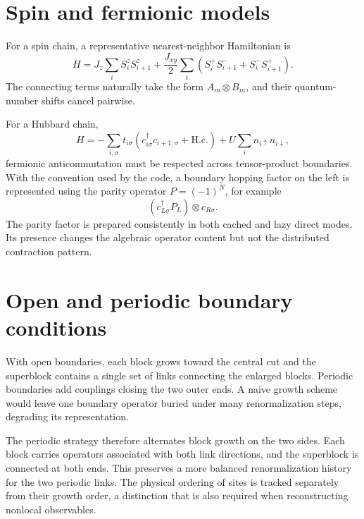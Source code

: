\documentclass[11pt,a4paper]{article}
\begin{document}
\section{Spin and fermionic models}

For a spin chain, a representative nearest-neighbor Hamiltonian is
\begin{equation}
  H=J_z\sum_i S_i^zS_{i+1}^z
    +\frac{J_{xy}}{2}\sum_i
     \left(S_i^+S_{i+1}^-+S_i^-S_{i+1}^+\right).
\end{equation}
The connecting terms naturally take the form $A_m\otimes B_m$, and their
quantum-number shifts cancel pairwise.

For a Hubbard chain,
\begin{equation}
  H=-\sum_{i,\sigma}t_{i\sigma}
    \left(c_{i\sigma}^\dagger c_{i+1,\sigma}+\mathrm{H.c.}\right)
    +U\sum_i n_{i\uparrow}n_{i\downarrow},
\end{equation}
fermionic anticommutation must be respected across tensor-product boundaries.
With the convention used by the code, a boundary hopping factor on the left
is represented using the parity operator $P=(-1)^N$, for example
\begin{equation}
  (c_{L\sigma}^\dagger P_L)\otimes c_{R\sigma}.
\end{equation}
The parity factor is prepared consistently in both cached and lazy direct
modes.  Its presence changes the algebraic operator content but not the
distributed contraction pattern.

\section{Open and periodic boundary conditions}

With open boundaries, each block grows toward the central cut and the
superblock contains a single set of links connecting the enlarged blocks.
Periodic boundaries add couplings closing the two outer ends.  A naive growth
scheme would leave one boundary operator buried under many renormalization
steps, degrading its representation.

The periodic strategy therefore alternates block growth on the two sides.
Each block carries operators associated with both link directions, and the
superblock is connected at both ends.  This preserves a more balanced
renormalization history for the two periodic links.  The physical ordering of
sites is tracked separately from their growth order, a distinction that is
also required when reconstructing nonlocal observables.
\end{document}
